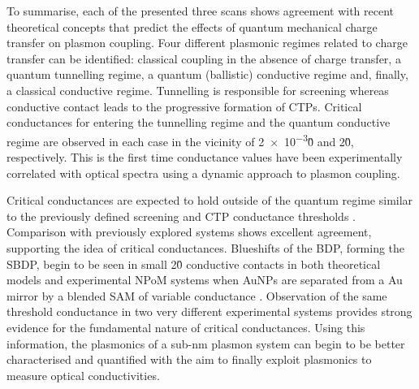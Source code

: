 \documentclass[a4paper, 11pt]{article}
\begin{document}
To summarise, each of the presented three scans shows agreement with recent theoretical concepts that predict the effects of quantum mechanical charge transfer on plasmon coupling. Four different plasmonic regimes related to charge transfer can be identified: classical coupling in the absence of charge transfer, a quantum tunnelling regime, a quantum (ballistic) conductive regime and, finally, a classical conductive regime. Tunnelling is responsible for screening whereas conductive contact leads to the progressive formation of CTPs. Critical conductances for entering the tunnelling regime and the quantum conductive regime are observed in each case in the vicinity of \num{2e-3}\G0 and 2\G0, respectively. This is the first time conductance values have been experimentally correlated with optical spectra using a dynamic approach to plasmon coupling.

Critical conductances are expected to hold outside of the quantum regime similar to the previously defined screening and CTP conductance thresholds \cite{perez2010, perez2011}. Comparison with previously explored systems shows excellent agreement, supporting the idea of critical conductances. Blueshifts of the BDP, forming the SBDP, begin to be seen in small 2\G0 conductive contacts in both theoretical models \cite{perez2010, perez2011} and experimental NPoM systems when AuNPs are separated from a Au mirror by a blended SAM of variable conductance \cite{benz2014}. Observation of the same threshold conductance in two very different experimental systems provides strong evidence for the fundamental nature of critical conductances.
Using this information, the plasmonics of a sub-nm plasmon system can begin to be better characterised and quantified with the aim to finally exploit plasmonics to measure optical conductivities.
\end{document}
